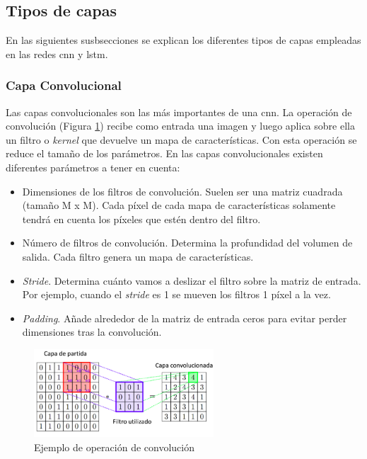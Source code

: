 \subsection{Tipos de capas}\label{tipos_capas}

En las siguientes susbsecciones se explican los diferentes tipos de capas empleadas en las redes \acrshort{cnn} y \acrshort{lstm}.


\subsubsection{Capa Convolucional}

Las capas convolucionales son las más importantes de una \acrshort{cnn}. La operación de convolución (Figura \ref{fig.convolucion}) recibe como entrada una imagen y luego aplica sobre ella un filtro o \textit{kernel} que devuelve un mapa de características. Con esta operación se reduce el tamaño de los parámetros. En las capas convolucionales existen diferentes parámetros a tener en cuenta:\\

\begin{itemize}
    \item Dimensiones de los filtros de convolución. Suelen ser una matriz cuadrada (tamaño M x M). Cada píxel de cada mapa de características solamente tendrá en cuenta los píxeles que estén dentro del filtro.
    
    \item Número de filtros de convolución. Determina la profundidad del volumen de salida. Cada filtro genera un mapa de características.
    
    \item \textit{Stride}. Determina cuánto vamos a deslizar el filtro sobre la matriz de entrada. Por  ejemplo, cuando el \textit{stride} es 1 se mueven los filtros 1 píxel a la vez. 
    
    \item \textit{Padding}. Añade alrededor de la matriz de entrada ceros para evitar perder dimensiones tras la convolución.
\end{itemize}

\begin{figure}[H]
  \begin{center}
    \includegraphics[width=0.6\textwidth]{figures/Introduccion/convolucion.png}
		\caption{Ejemplo de operación de convolución}
		\label{fig.convolucion}
		\end{center}
\end{figure}

